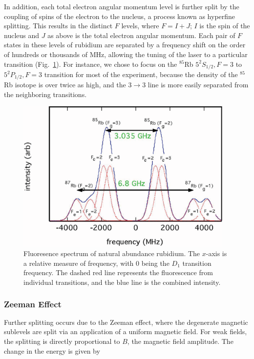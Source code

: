 In addition, each total electron angular momentum level is further
split by the coupling of spins of the electron to the nucleus, a process known
as hyperfine splitting. This results in the distinct $F$ levels, where
$F = I + J$; $I$ is the spin of the nucleus and $J$ as above is the
total electron angular momentum. Each pair of $F$ states in these
levels of rubidium are separated by a frequency shift on the order of
hundreds or thousands of MHz, allowing the tuning of the laser to a
particular transition (Fig.~\ref{fig:fluor}). For instance, we
chose to focus on the $^{85}$Rb $5^2S_{1/2}, F = 3$ to $5^2P_{1/2}, F
= 3$ transition for most of the experiment, because the density of the
$^{85}$Rb isotope is over twice as high, and the $3\rightarrow3$ line is
more easily separated from the neighboring transitions.

\begin{figure}[h]
\begin{center}
\includegraphics[height=3in]{figures/fluorescence.eps}
\caption{\small{Fluoresence spectrum of natural abundance rubidium. The $x$-axis is a relative measure of frequency, with $0$ being the $D_1$ transition frequency. The dashed red line represents the fluorescence from individual transitions, and the blue line is the combined intensity.}}
\label{fig:fluor}
\end{center}
\end{figure}


\subsubsection{Zeeman Effect}
Further splitting occurs due to the Zeeman effect, where the
degenerate magnetic sublevels are split via an application of a
uniform magnetic field. For weak fields, the splitting is directly
proportional to $B$, the magnetic field amplitude. The change in the
energy is given by

